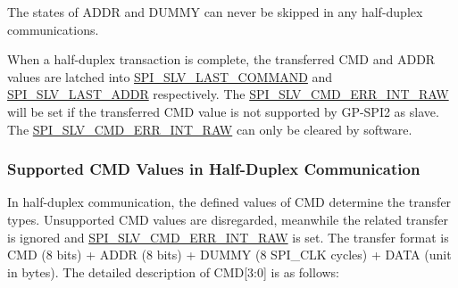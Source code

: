 \documentclass[main\_\_EN.tex]{subfiles}
\begin{document}
\begin{tiplisting}
The states of ADDR and DUMMY can never be skipped in any half-duplex communications.
\end{tiplisting}
\vspace{-1em}
When a half-duplex transaction is complete, the transferred CMD and ADDR values are latched into \hyperref[fielddesc:SPISLVLASTCOMMAND]{SPI\_SLV\_LAST\_COMMAND} and \hyperref[fielddesc:SPISLVLASTADDR]{SPI\_SLV\_LAST\_ADDR} respectively. The \hyperref[fielddesc:SPISLVCMDERRINTRAW]{SPI\_SLV\_CMD\_ERR\_INT\_RAW} will be set if the transferred CMD value is not supported by GP-SPI2 as slave. The \hyperref[fielddesc:SPISLVCMDERRINTRAW]{SPI\_SLV\_CMD\_ERR\_INT\_RAW} can only be cleared by software.

\subsubsection{Supported CMD Values in Half-Duplex Communication} \label{para:spi-cmd-values-half-duplex-comm}

In half-duplex communication, the defined values of CMD determine the transfer types. Unsupported CMD values are disregarded, meanwhile the related transfer is ignored and \hyperref[fielddesc:SPISLVCMDERRINTRAW]{SPI\_SLV\_CMD\_ERR\_INT\_RAW} is set. The transfer format is CMD (8 bits) + ADDR (8 bits) + DUMMY (8 SPI\_CLK cycles) + DATA (unit in bytes). The detailed description of CMD[3:0] is as follows:
\end{document}
